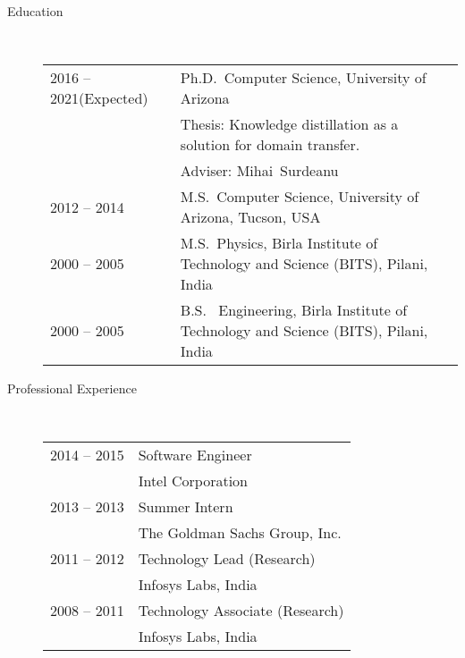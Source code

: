 \documentclass[10pt]{article}
\begin{document}
\begin{description}

\item [Education]\

\begin{tabular}{lp{4.5in}}
\hspace{-.2cm}2016 -- 2021(Expected) &  Ph.D.~Computer Science, {\sc University of Arizona}
\\\vspace{.0cm}&Thesis: Knowledge distillation as a solution for domain transfer. 
\\\vspace{.1cm}& Adviser: Mihai~Surdeanu\\
\vspace{.1cm}\hspace{-.2cm}2012 -- 2014&  M.S.~Computer Science, {\sc University of Arizona, Tucson, USA} \\
\vspace{.1cm}\hspace{-.2cm}2000 -- 2005 &  M.S.~Physics, {\sc Birla Institute of Technology and Science (BITS), Pilani, India} \\
\hspace{-.2cm}2000 -- 2005 & B.S.~ Engineering,  {\sc Birla Institute of Technology and Science (BITS), Pilani, India}
\end{tabular}


\item [Professional Experience]\

\begin{tabular}{lp{4.9in}}


\hspace{-.2cm}2014 -- 2015 & Software Engineer\\\vspace{.1cm}
& {\sc Intel Corporation} \\

\hspace{-.2cm}2013 -- 2013 & Summer Intern\\\vspace{.1cm}
& {\sc The Goldman Sachs Group, Inc.} \\

\hspace{-.2cm}2011 -- 2012 & Technology Lead (Research)\\\vspace{.1cm}
&  {\sc Infosys Labs, India} \\

\hspace{-.2cm}2008 -- 2011 & Technology Associate (Research)\\\vspace{.1cm}
& {\sc Infosys Labs, India} \\


\end{tabular}
\end{description}
\end{document}
